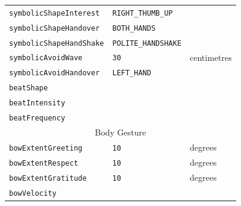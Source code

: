 \documentclass{CSSRforAfrica}
\begin{document}
\begin{table}[H]
\begin{center}
\begin{tabular}{|l l l|}
{\footnotesize \verb+symbolicShapeInterest+} 	         & {\footnotesize \verb+RIGHT_THUMB_UP+ } & {\footnotesize  }\vspace{-1.01mm}\\
{\footnotesize \verb+symbolicShapeHandover+} 	        & {\footnotesize \verb+BOTH_HANDS+} & {\footnotesize  }\vspace{-1.01mm}\\
{\footnotesize \verb+symbolicShapeHandShake+} 	                 & {\footnotesize \verb+POLITE_HANDSHAKE+} & {\footnotesize  }\vspace{-1.01mm}\\
{\footnotesize \verb+symbolicAvoidWave+} 	                 & {\footnotesize \verb+30+  } & {\footnotesize centimetres }\vspace{-1.01mm}\\
{\footnotesize \verb+symbolicAvoidHandover+} 	   & {\footnotesize \verb+LEFT_HAND+ }& {\footnotesize }\vspace{-1.01mm}\\
{\footnotesize \verb+beatShape+} 	                         & {\footnotesize \verb++} & {\footnotesize  }\vspace{-1.01mm}\\
{\footnotesize \verb+beatIntensity+} 	                 & {\footnotesize \verb++} & {\footnotesize  }\vspace{-1.01mm}\\
{\footnotesize \verb+beatFrequency+} 	                 & {\footnotesize \verb++} & {\footnotesize  }\vspace{-1.01mm}\\ 
\hline
\multicolumn{3}{|c|}{{\footnotesize Body Gesture}} \vspace{-0mm}\\
\hline
{\footnotesize \verb+bowExtentGreeting+} 	                        & {\footnotesize \verb+10+} & {\footnotesize  degrees}\vspace{-1.01mm}\\
{\footnotesize \verb+bowExtentRespect+} 	                        & {\footnotesize \verb+10+} & {\footnotesize  degrees}\vspace{-1.01mm}\\
{\footnotesize \verb+bowExtentGratitude+} 	                        & {\footnotesize \verb+10+} & {\footnotesize  degrees}\vspace{-1.01mm}\\
{\footnotesize \verb+bowVelocity+}                       & {\footnotesize \verb++} & {\footnotesize  }\vspace{-1.01mm}\\

\end{tabular}
\end{center}
\end{table}
\end{document}
